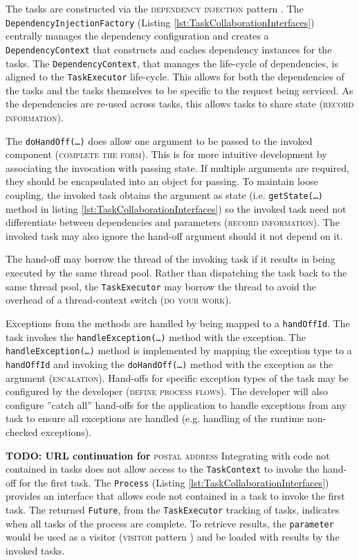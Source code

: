 \documentclass[prodmode]{style/acmlarge}
\begin{document}
The tasks are constructed via the \textsc{dependency injection} pattern
\cite{ioc}.  The \texttt{Dependency\-InjectionFactory} (Listing
\ref{lst:TaskCollaborationInterfaces}) centrally manages the dependency
configuration and creates a \texttt{Depend\-ency\-Context} that constructs and
caches dependency instances for the tasks.  The \texttt{Dependency\-Context},
that manages the life-cycle of dependencies, is aligned to the
\texttt{TaskExecutor} life-cycle.  This allows for both the dependencies of the
tasks and the tasks themselves to be specific to the request being serviced.
As the dependencies are re-used across tasks, this allows tasks to share state
(\textsc{record information}).

The \texttt{doHandOff(\ldots)} does allow one argument to be passed to the
invoked component (\textsc{complete the form}).  This is for more intuitive
development by associating the invocation with passing state.  If multiple
arguments are required, they should be encapsulated into an object for passing.
To maintain loose coupling, the invoked task obtains the argument as state (i.e.
\texttt{getState(\ldots)} method in listing
\ref{lst:TaskCollaborationInterfaces}) so the invoked task need not
differentiate between dependencies and parameters (\textsc{record information}).
The invoked task may also ignore the hand-off argument should it not depend on
it.

The hand-off may borrow the thread of the invoking task if it results in being
executed by the same thread pool.  Rather than dispatching the task back to the
same thread pool, the \texttt{TaskExecutor} may borrow the thread to avoid the
overhead of a thread-context switch (\textsc{do your work}).

Exceptions from the methods are handled by being mapped to a \texttt{handOffId}.
 The task invokes the \texttt{handle\-Excep\-tion(\ldots)} method with the
exception.  The \texttt{handleException(\ldots)} method is implemented by
mapping the exception type to a \texttt{handOffId} and invoking the
\texttt{doHandOff(\ldots)} method with the exception as the argument
(\textsc{escalation}).  Hand-offs for specific exception types of the task may
be configured by the developer (\textsc{define process flows}).  The developer
will also configure ''catch all'' hand-offs for the application to handle
exceptions from any task to ensure all exceptions are handled (e.g. handling of
the runtime non-checked exceptions).

\textbf{TODO: URL continuation for} \textsc{postal address} Integrating with
code not contained in tasks does not allow access to the \texttt{TaskContext} to
invoke the hand-off for the first task.  The \texttt{Process} (Listing
\ref{lst:TaskCollaborationInterfaces}) provides an interface that allows code
not contained in a task to invoke the first task.  The returned \texttt{Future},
from the \texttt{TaskExecutor} tracking of tasks, indicates when all tasks of
the process are complete.  To retrieve results, the \texttt{parameter} would be
used as a visitor (\textsc{visitor} pattern \cite{gof}) and be loaded with
results by the invoked tasks.
\end{document}
